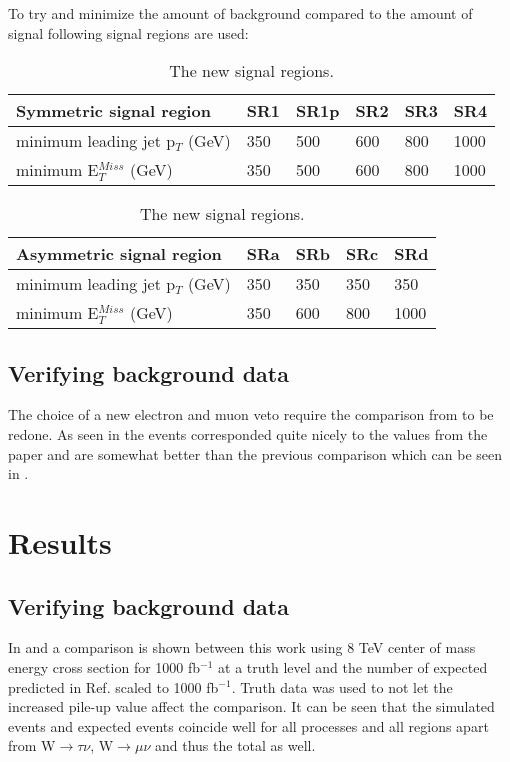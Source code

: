 To try and minimize the amount of background compared to the amount of signal following  signal regions are used:
\begin{table}[h]
\renewcommand{\arraystretch}{1.2} %
\begin{center}
\begin{tabular}{l l l l l l}
\hline
Symmetric signal region & SR1 & SR1p & SR2 & SR3 & SR4 \\ \hline
minimum leading jet p$_T$ (GeV) & 350 &500& 600 & 800 & 1000 \\
minimum E$^{Miss}_T$ (GeV) & 350&500 & 600 & 800 & 1000 \\
\end{tabular}
\begin{tabular}{l l l l l} \hline
Asymmetric signal region & SRa &  SRb & SRc & SRd \\ \hline
minimum leading jet p$_T$ (GeV) & 350 & 350 & 350 & 350 \\
minimum E$^{Miss}_T$ (GeV) & 350 & 600 & 800 & 1000 \\ \hline
\end{tabular}
\caption{The new signal regions.}
\label{tab:newsr}
\end{center}
\renewcommand{\arraystretch}{1.0} %
\end{table}

\subsection{Verifying background data}
The choice of a new electron and muon veto require the comparison from  to be redone. As seen in  the events corresponded quite nicely to the values from the paper and are somewhat better than the previous comparison which can be seen in .

\newpage
\section{Results}\label{chap:sig:sec:res}
\subsection{Verifying background data}\label{Verifying background data}
In  and  a comparison is shown between this work using 8 TeV center of mass energy cross section for 1000 fb$^{-1}$ at a truth level and the number of expected predicted in Ref. \citep{ATLAS-CONF-2012-147} scaled to 1000 fb$^{-1}$. Truth data was used to not let the increased pile-up value affect the comparison. It can be seen that the simulated events and expected events coincide well for all processes and all regions apart from W$\rightarrow\tau\nu$, W$\rightarrow\mu\nu$ and thus the total as well. 

